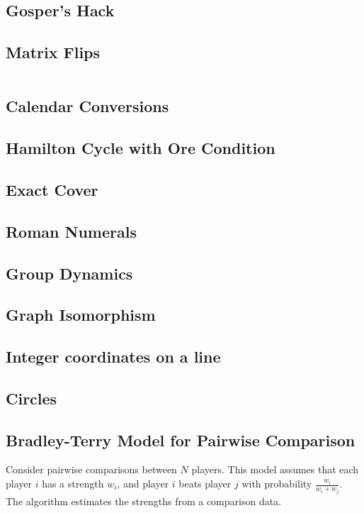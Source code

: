 \subsection{Gosper's Hack}
\subsection{Matrix Flips}

\hrulefill
\begin{multicols}{2}
\inputminted[autogobble,fontsize=\tiny]{C++}{Misc/rotate.cpp}
\end{multicols}
\hrulefill

\subsection{Calendar Conversions}
\subsection{Hamilton Cycle with Ore Condition}
\subsection{Exact Cover}
\subsection{Roman Numerals}
\subsection{Group Dynamics}
\subsection{Graph Isomorphism}
\subsection{Integer coordinates on a line}
\subsection{Circles}
\subsection{Bradley-Terry Model for Pairwise Comparison}

Consider pairwise comparisons between $N$ players.
This model assumes that each player $i$ has a strength $w_i$,
and player $i$ beats player $j$ with probability $\frac{w_i}{w_i + w_j}$.
The algorithm estimates the strengths from a comparison data.

